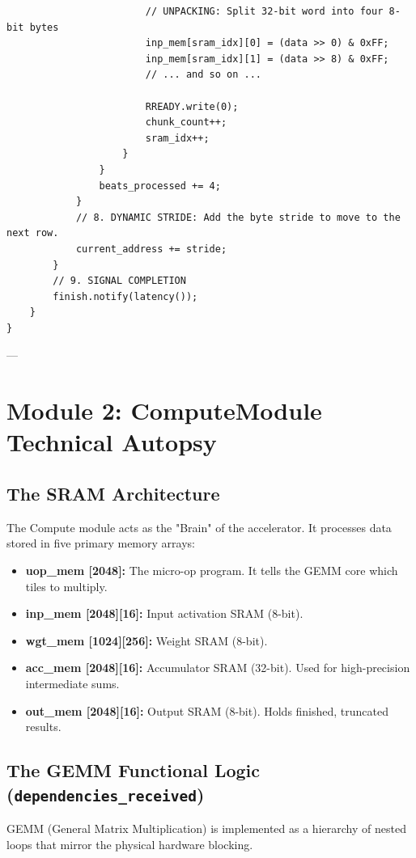 \documentclass[11pt,a4paper]{report}
\begin{document}
\begin{lstlisting}
                        // UNPACKING: Split 32-bit word into four 8-bit bytes
                        inp_mem[sram_idx][0] = (data >> 0) & 0xFF;
                        inp_mem[sram_idx][1] = (data >> 8) & 0xFF;
                        // ... and so on ...
                        
                        RREADY.write(0); 
                        chunk_count++;
                        sram_idx++;
                    }
                }
                beats_processed += 4;
            }
            // 8. DYNAMIC STRIDE: Add the byte stride to move to the next row.
            current_address += stride;
        }
        // 9. SIGNAL COMPLETION
        finish.notify(latency());
    }
}
\end{lstlisting}

---

\chapter{Module 2: ComputeModule Technical Autopsy}

\section{The SRAM Architecture}
The Compute module acts as the "Brain" of the accelerator. It processes data stored in five primary memory arrays:
\begin{itemize}
    \item \textbf{uop\_mem [2048]:} The micro-op program. It tells the GEMM core which tiles to multiply.
    \item \textbf{inp\_mem [2048][16]:} Input activation SRAM (8-bit).
    \item \textbf{wgt\_mem [1024][256]:} Weight SRAM (8-bit).
    \item \textbf{acc\_mem [2048][16]:} Accumulator SRAM (32-bit). Used for high-precision intermediate sums.
    \item \textbf{out\_mem [2048][16]:} Output SRAM (8-bit). Holds finished, truncated results.
\end{itemize}

\section{The GEMM Functional Logic (\texttt{dependencies\_received})}
GEMM (General Matrix Multiplication) is implemented as a hierarchy of nested loops that mirror the physical hardware blocking.
\end{document}
